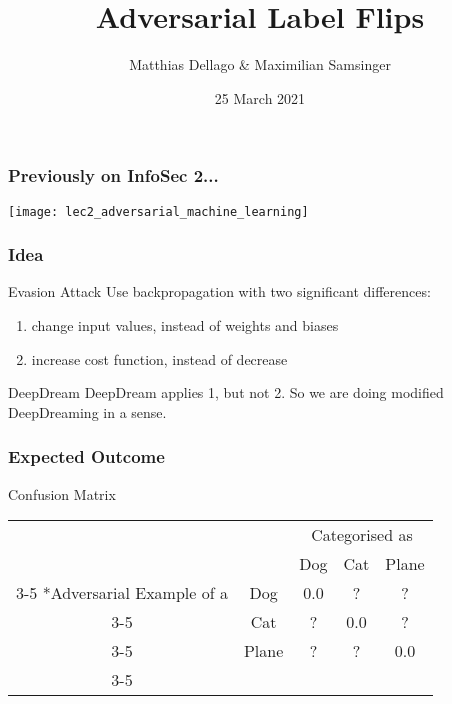 \documentclass[10pt,usepdftitle=false,aspectratio=169]{beamer}
\title{Adversarial Label Flips}
\author{Matthias Dellago \& Maximilian Samsinger}
\date{25 March 2021}
\begin{document}
\DeclarePairedDelimiter\abs{\lvert}{\rvert}%
\DeclarePairedDelimiter\norm{\lVert}{\rVert}%
\DeclarePairedDelimiter\ceil{\lceil}{\rceil}
\DeclarePairedDelimiter\floor{\lfloor}{\rfloor}

\begin{frame}[plain]
	\maketitle
\end{frame}	

\begin{frame}[fragile]
	\frametitle{Previously on InfoSec 2...}
		\texttt{[image: lec2\_adversarial\_machine\_learning]}
\end{frame}

\begin{frame}[fragile]
	\frametitle{Idea}
		\begin{block}{Evasion Attack}
			Use backpropagation with two significant differences:
			\begin{enumerate}
				\item change input values, instead of weights and biases
				\item increase cost function, instead of decrease
			\end{enumerate} 
		\end{block}
		\begin{block}{DeepDream}
			DeepDream applies 1, but not 2. So we are doing modified DeepDreaming in a sense.
		\end{block}
\end{frame}

\begin{frame}[fragile]
	\frametitle{Expected Outcome}
	\begin{block}{Confusion Matrix}
		  \begin{table}
			\setlength{\extrarowheight}{2pt}
			\begin{tabular}{cc|c|c|c|}
				& \multicolumn{1}{c}{} & \multicolumn{3}{c}{Categorised as}\\
				& \multicolumn{1}{c}{} & \multicolumn{1}{c}{Dog}  & \multicolumn{1}{c}{Cat} & \multicolumn{1}{c}{Plane} \\\cline{3-5}
				\multirow{3}*{Adversarial Example of a}  & Dog & 0.0 & ? & ?\\\cline{3-5}
				& Cat & ? & 0.0 &  ? \\\cline{3-5}
				& Plane & ? & ? &  0.0 \\\cline{3-5}
			\end{tabular}
		\end{table}
	\end{block}
\end{frame}
\end{document}
